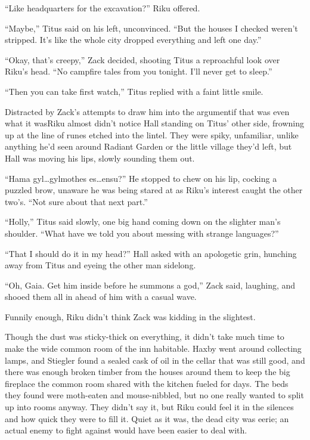 ``Like headquarters for the excavation?'' Riku offered.

``Maybe,'' Titus said on his left, unconvinced. ``But the houses I checked weren't stripped. It's like the whole city dropped everything and left one day.''

``Okay, that's creepy,'' Zack decided, shooting Titus a reproachful look over Riku's head. ``No campfire tales from you tonight. I'll never get to sleep.''

``Then you can take first watch,'' Titus replied with a faint little smile.

Distracted by Zack's attempts to draw him into the argument\textemdash if that was even what it was\textemdash Riku almost didn't notice Hall standing on Titus' other side, frowning up at the line of runes etched into the lintel. They were spiky, unfamiliar, unlike anything he'd seen around Radiant Garden or the little village they'd left, but Hall was moving his lips, slowly sounding them out.

``Hama gyl\ldots gylmothes es\ldots ensu?'' He stopped to chew on his lip, cocking a puzzled brow, unaware he was being stared at as Riku's interest caught the other two's. ``Not sure about that next part.''

``Holly,'' Titus said slowly, one big hand coming down on the slighter man's shoulder. ``What have we told you about messing with strange languages?''

``That I should do it in my head?'' Hall asked with an apologetic grin, hunching away from Titus and eyeing the other man sidelong.

``Oh, Gaia. Get him inside before he summons a god,'' Zack said, laughing, and shooed them all in ahead of him with a casual wave.

Funnily enough, Riku didn't think Zack was kidding in the slightest.

\scenechange

Though the dust was sticky-thick on everything, it didn't take much time to make the wide common room of the inn habitable. Haxby went around collecting lamps, and Stiegler found a sealed cask of oil in the cellar that was still good, and there was enough broken timber from the houses around them to keep the big fireplace the common room shared with the kitchen fueled for days. The beds they found were moth-eaten and mouse-nibbled, but no one really wanted to split up into rooms anyway. They didn't say it, but Riku could feel it in the silences and how quick they were to fill it. Quiet as it was, the dead city was eerie; an actual enemy to fight against would have been easier to deal with.

